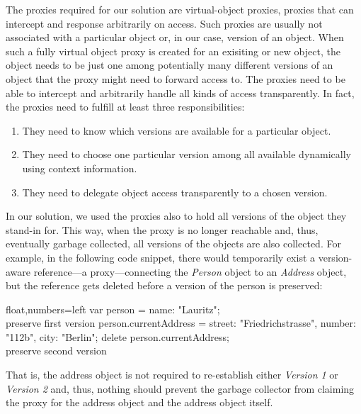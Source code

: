 The proxies required for our solution are virtual-object proxies, proxies that can intercept and response arbitrarily on access.
Such proxies are usually not associated with a particular object or, in our case, version of an object.
When such a fully virtual object proxy is created for an exisiting or new object, the object needs to be just one among potentially many different versions of an object that the proxy might need to forward access to.
The proxies need to be able to intercept and arbitrarily handle all kinds of access transparently.
In fact, the proxies need to fulfill at least three responsibilities:
\begin{enumerate}
    \item They need to know which versions are available for a particular object.
    \item They need to choose one particular version among all available dynamically using context information.
    \item They need to delegate object access transparently to a chosen version.
\end{enumerate}

In our solution, we used the proxies also to hold all versions of the object they stand-in for.
This way, when the proxy is no longer reachable and, thus, eventually garbage collected, all versions of the objects are also collected.
For example, in the following code snippet, there would temporarily exist a version-aware reference---a proxy---connecting the \emph{Person} object to an \emph{Address} object, but the reference gets deleted before a version of the person is preserved:

\begin{code}{}{float,numbers=left}
    var person = {name: "Lauritz"};
    \\ preserve first version
    person.currentAddress = {street: "Friedrichstrasse",
                         number: "112b",
                         city: "Berlin"};
    delete person.currentAddress;
    \\ preserve second version
\end{code}
\iffalse
\end{verbatim}\fi

That is, the address object is not required to re-establish either \emph{Version 1} or \emph{Version 2} and, thus, nothing should prevent the garbage collector from claiming the proxy for the address object and the address object itself.


